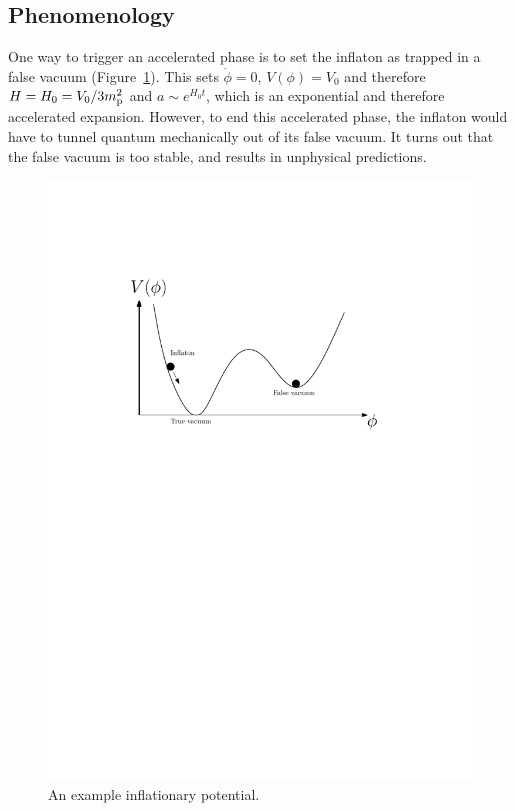 \subsection{Phenomenology}
One way to trigger an accelerated phase is to set the inflaton as trapped in a false vacuum (Figure~\ref{fig:cos:potential}). This sets $\dot{\phi}=0$, $V(\phi)=V_0$ and therefore $H=H_0=V_0/3m_{\mathrm{p}}^2$ and $a\sim e^{H_0t}$, which is an exponential and therefore accelerated expansion. However, to end this accelerated phase, the inflaton would have to tunnel quantum mechanically out of its false vacuum. It turns out that the false vacuum is too stable, and results in unphysical predictions.

\begin{figure}
  \centering
  \includegraphics[width=\textwidth]{chapter_inflationary_cosmology/figures/potential}
  \caption{An example inflationary potential.}\label{fig:cos:potential}
\end{figure}

